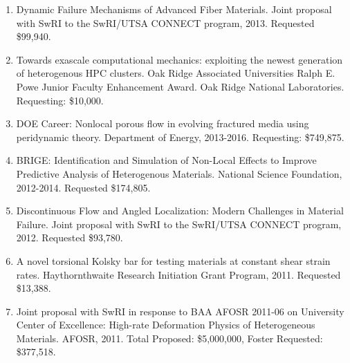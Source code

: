 \begin{enumerate}
    \item Dynamic Failure Mechanisms of Advanced Fiber Materials. Joint proposal with SwRI to the SwRI/UTSA CONNECT program, 2013. Requested \$99,940.
    \item Towards exascale computational mechanics: exploiting the newest generation of heterogenous HPC clusters. Oak Ridge Associated Universities Ralph E. Powe Junior Faculty Enhancement Award. Oak Ridge National Laboratories. Requesting: \$10,000. 
    \item DOE Career: Nonlocal porous flow in evolving fractured media using peridynamic theory. Department of Energy, 2013-2016. Requesting: \$749,875. 
    \item BRIGE: Identification and Simulation of Non-Local Effects to Improve Predictive Analysis of Heterogenous Materials. National Science Foundation, 2012-2014. Requested \$174,805.
    \item Discontinuous Flow and Angled Localization: Modern Challenges in Material Failure. Joint proposal with SwRI to the SwRI/UTSA CONNECT program, 2012. Requested \$93,780.
    \item A novel torsional Kolsky bar for testing materials at constant shear strain rates. Haythornthwaite Research Initiation Grant Program, 2011. Requested \$13,388.
    \item Joint proposal with SwRI in response to BAA AFOSR 2011-06 on University Center of Excellence: High-rate Deformation Physics of Heterogeneous Materials. AFOSR, 2011. Total Proposed: \$5,000,000, Foster Requested: \$377,518.
\end{enumerate}
